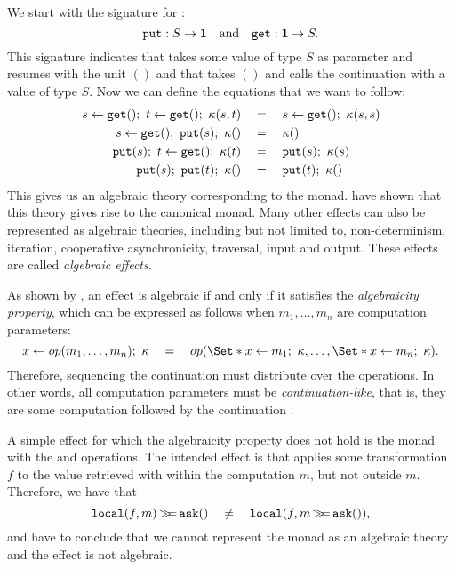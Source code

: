 We start with the signature for :
\[
    \mathtt{put} : S \to \mathbf{1}
    \quad\text{and}\quad
    \mathtt{get} : \mathbf{1} \to S.
\]
This signature indicates that \oput takes some value of type $S$ as parameter and resumes with the unit $()$ and that \oget takes $()$ and calls the continuation with a value of type $S$. Now we can define the equations that we want  to follow:
\begin{align*}
    s \gets \mathtt{get}() ;\  t \gets \mathtt{get}() ;\  \kappa(s,t)
        &\quad=\quad s \gets \mathtt{get}();\  \kappa(s, s) \\
    s \gets\mathtt{get}();\  \mathtt{put}(s);\  \kappa() &\quad=\quad \kappa () \\
    \mathtt{put}(s);\  t\gets\mathtt{get}();\  \kappa(t) &\quad=\quad \mathtt{put}(s);\  \kappa(s) \\
    \mathtt{put}(s);\  \mathtt{put}(t);\  \kappa() &\quad=\quad \mathtt{put}(t);\  \kappa()
\end{align*}
This gives us an algebraic theory corresponding to the  monad. \textcite{goos_adequacy_2001} have shown that this theory gives rise to the canonical  monad. Many other effects can also be represented as algebraic theories, including but not limited to, non-determinism, iteration, cooperative asynchronicity, traversal, input and output\citationneeded. These effects are called \emph{algebraic effects}.


As shown by \textcite{plotkin_algebraic_2003}, an effect is algebraic if and only if it satisfies the \emph{algebraicity property}, which can be expressed as follows when $m_1, \dots, m_n$ are computation parameters:
\[
    x \gets op(m_1, \dots, m_n)\seq \kappa \quad=\quad op(\S{x \gets m_1\seq \kappa}, \dots, \S{x \gets m_n\seq\kappa}).
\]
Therefore, sequencing the continuation must distribute over the operations. In other words, all computation parameters must be \emph{continuation-like}, that is, they are some computation followed by the continuation \autocite{bach_poulsen_hefty_2023}.

A simple effect for which the algebraicity property does not hold is the  monad with the \olocal and \oask operations. The intended effect is that \olocal applies some transformation $f$ to the value retrieved with \oask within the computation $m$, but not outside $m$. Therefore, we have that
\[
    \mathtt{local}(f, m) \operatorname{\mathtt{\gg\!\!=}} \mathtt{ask}() \quad\neq\quad \mathtt{local}(f, m \operatorname{\mathtt{\gg\!\!=}} \mathtt{ask}()),
\]
and have to conclude that we cannot represent the  monad as an algebraic theory and the effect is not algebraic.

